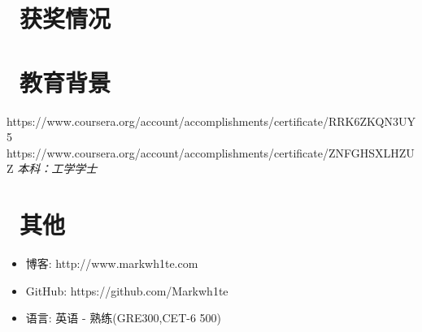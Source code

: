 \documentclass{resume}
\begin{document}
\section{\faHeartO\ 获奖情况}
\section{\faGraduationCap\  教育背景}

https://www.coursera.org/account/accomplishments/certificate/RRK6ZKQN3UY5
https://www.coursera.org/account/accomplishments/certificate/ZNFGHSXLHZUZ
\textit{本科：工学学士}\ 

\section{\faInfo\ 其他}
\begin{itemize}[parsep=0.5ex]
  \item 博客: http://www.markwh1te.com
  \item GitHub: https://github.com/Markwh1te
  \item 语言: 英语 - 熟练(GRE300,CET-6 500)
\end{itemize}

%
%
\end{document}
